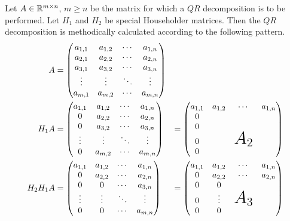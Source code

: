 \begin{example}\label{ex:householder} 
	Let $A \in \mathbb{R}^{m \times n}$, $m \geq n$ be the matrix for which a $QR$ decomposition is to be performed. Let $H_1$ and $H_2$ be special Householder matrices. Then the $QR$ decomposition is methodically calculated according to the following pattern. 
	\begin{subequations}
		\begin{align*}
		A &= 
		\begin{pmatrix}
		a_{1,1} & a_{1,2} & \cdots & a_{1,n} \\
		a_{2,1} & a_{2,2} & \cdots & a_{2,n} \\
		a_{3,1} & a_{3,2} & \cdots & a_{3,n} \\
		\vdots  & \vdots  & \ddots & \vdots  \\
		a_{m,1} & a_{m,2} & \cdots & a_{m,n} 
		\end{pmatrix} 
		\\
		H_1 A &= 
		\begin{pmatrix}
		a_{1,1} & a_{1,2} & \cdots & a_{1,n} \\
		0		& a_{2,2} & \cdots & a_{2,n} \\
		0		& a_{3,2} & \cdots & a_{3,n} \\
		\vdots  & \vdots  & \ddots & \vdots  \\
		0		& a_{m,2} & \cdots & a_{m,n} 
		\end{pmatrix} 
		&= 
		\begin{pmatrix}
		a_{1,1} & a_{1,2} & \cdots & a_{1,n} \\
		0 		&  		  &		   &  \\
		0 		&  		  &		   &  \\
		0  		&   	  & \text{\huge$A_2$} &   \\
		0		& 		  &  	   & 
		\end{pmatrix}\\
		H_2 H_1 A &= 
		\begin{pmatrix}
		a_{1,1} & a_{1,2} & \cdots & a_{1,n} \\
		0		& a_{2,2} & \cdots & a_{2,n} \\
		0		& 0		  & \cdots & a_{3,n} \\
		\vdots  & \vdots  & \ddots & \vdots  \\
		0		& 0		  & \cdots & a_{m,n} 
		\end{pmatrix}
		&= 
		\begin{pmatrix}
		a_{1,1} & a_{1,2} & \cdots & a_{1,n} \\
		0 		& a_{2,2} &	\cdots & a_{2,n} \\
		0 		& 0		  &		   &  \\
		0  		& \vdots  & \text{\huge$A_3$} &   \\
		0		& 0		  &  	   & 
		\end{pmatrix}
		\end{align*}
	\end{subequations}
\end{example}

